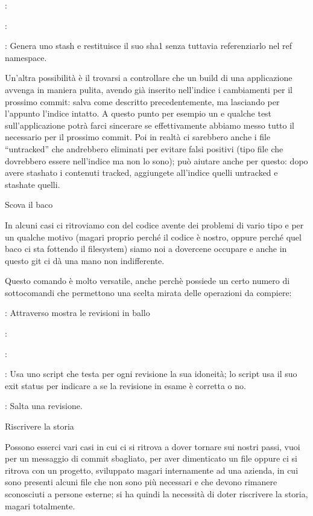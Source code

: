 \elemento{}:

\elemento{}:

\elemento{}: Genera uno stash e restituisce il suo sha1 senza
tuttavia referenziarlo nel ref namespace.

Un'altra possibilit\`a \`e il trovarsi a controllare che un build di una
applicazione avvenga in maniera pulita, avendo gi\`a inserito nell'indice i
cambiamenti per il prossimo commit:  salva
come descritto precedentemente, ma lasciando per l'appunto l'indice intatto. A
questo punto per esempio un  e qualche test sull'applicazione potr\`a
farci sincerare se effettivamente abbiamo messo tutto il necessario per il
prossimo commit. Poi in realt\`a ci sarebbero anche i file ``untracked'' che
andrebbero eliminati per evitare falsi positivi (tipo file che dovrebbero essere
nell'indice ma non lo sono);  pu\`o aiutare anche per questo: dopo
avere stashato i contenuti tracked, aggiungete all'indice quelli untracked e
stashate quelli.

\sezione Scova il baco

In alcuni casi ci ritroviamo con del codice avente dei problemi di vario tipo e
per un qualche motivo (magari proprio perch\'e il codice \`e nostro, oppure
perch\'e quel baco ci sta fottendo il filesystem) siamo noi a dovercene occupare
e anche in questo git ci d\`a una mano non indifferente.



Questo comando \`e molto versatile, anche perch\`e possiede un certo numero di
sottocomandi che permettono una scelta mirata delle operazioni da compiere:

\elemento{}: Attraverso  mostra le revisioni in ballo

\elemento{}: 

\elemento{}: 

\elemento{}: Usa uno script che testa per ogni revisione la sua
idoneit\`a; lo script usa il suo exit status per indicare a  se
la revisione in esame \`e corretta o no.

\elemento{}: Salta una revisione.

\sezione Riscrivere la storia

Possono esserci vari casi in cui ci si ritrova a dover tornare sui nostri passi,
vuoi per un messaggio di commit sbagliato, per aver dimenticato un file oppure
ci si ritrova con un progetto, sviluppato magari internamente ad
una azienda, in cui sono presenti alcuni file che non sono più necessari e che
devono rimanere sconosciuti a persone esterne; si ha quindi la necessit\`a di
doter riscrivere la storia, magari totalmente.

